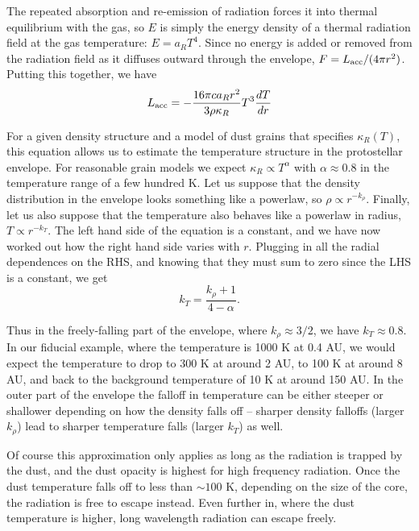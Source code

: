 The repeated absorption and re-emission of radiation forces it into thermal equilibrium with the gas, so $E$ is simply the energy density of a thermal radiation field at the gas temperature: $E=a_R T^4$. Since no energy is added or removed from the radiation field as it diffuses outward through the envelope, $F=L_{\rm acc}/(4\pi r^2)$. Putting this together, we have
\begin{equation}
L_{\rm acc}=-\frac{16\pi ca_R r^2}{3\rho\kappa_R} T^3 \frac{dT}{dr}
\end{equation}

For a given density structure and a model of dust grains that specifies $\kappa_R(T)$, this equation allows us to estimate the temperature structure in the protostellar envelope. For reasonable grain models we expect $\kappa_R\propto T^\alpha$ with $\alpha\approx 0.8$ in the temperature range of a few hundred K. Let us suppose that the density distribution in the envelope looks something like a powerlaw, so $\rho\propto r^{-k_{\rho}}$. Finally, let us also suppose that the temperature also behaves like a powerlaw in radius, $T\propto r^{-k_T}$. The left hand side of the equation is a constant, and we have now worked out how the right hand side varies with $r$. Plugging in all the radial dependences on the RHS, and knowing that they must sum to zero since the LHS is a constant, we get
\begin{equation}
k_T = \frac{k_{\rho} + 1}{4-\alpha}.
\end{equation}

Thus in the freely-falling part of the envelope, where $k_{\rho}\approx 3/2$, we have $k_T\approx 0.8$. In our fiducial example, where the temperature is 1000 K at 0.4 AU, we would expect the temperature to drop to 300 K at around 2 AU, to 100 K at around 8 AU, and back to the background temperature of 10 K at around 150 AU. In the outer part of the envelope the falloff in temperature can be either steeper or shallower depending on how the density falls off -- sharper density falloffs (larger $k_{\rho}$) lead to sharper temperature falls (larger $k_T$) as well.

Of course this approximation only applies as long as the radiation is trapped by the dust, and the dust opacity is highest for high frequency radiation. Once the dust temperature falls off to less than $\sim 100$ K, depending on the size of the core, the radiation is free to escape instead. Even further in, where the dust temperature is higher, long wavelength radiation can escape freely.


